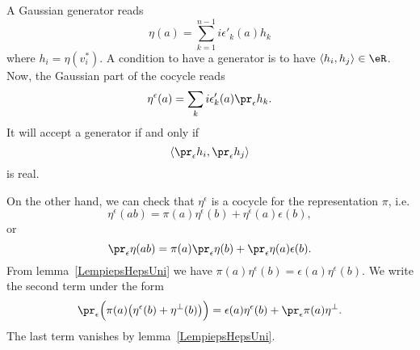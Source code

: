 A Gaussian generator reads
\begin{equation}
	\eta(a)=\sum_{k=1}^{n-1}i\epsilon'_k(a)h_k
\end{equation}
where \(h_i=\eta(v_i^*)\). A condition to have a generator is to have \(\langle h_i, h_j\rangle \in\eR\). Now, the Gaussian part of the cocycle reads
\begin{equation}
	\eta^{\epsilon}(a)=\sum_ki\epsilon'_k(a)\pr_{\epsilon}h_k.
\end{equation}
It will accept a generator if and only if
\begin{equation}
	\langle \pr_{\epsilon}h_i, \pr_{\epsilon}h_j\rangle
\end{equation}
is real.

On the other hand, we can check that \(\eta^{\epsilon}\) is a cocycle for the representation \(\pi\), i.e.
\begin{equation}
	\eta^{\epsilon}(ab)=\pi(a)\eta^{\epsilon}(b)+\eta^{\epsilon}(a)\epsilon(b),
\end{equation}
or
\begin{equation}
	\pr_{\epsilon}\eta(ab)=\pi(a)\pr_{\epsilon}\eta(b)+\pr_{\epsilon}\eta(a)\epsilon(b).
\end{equation}
From lemma~\ref{LempiepsHepsUni} we have \(\pi(a)\eta^{\epsilon}(b)=\epsilon(a)\eta^{\epsilon}(b)\). We write the second term under the form
\begin{equation}
	\pr_{\epsilon}\Big( \pi(a)\big( \eta^{\epsilon}(b)+\eta^{\perp}(b) \big) \Big)=\epsilon(a)\eta^{\epsilon}(b)+\pr_{\epsilon}\pi(a)\eta^{\perp}.
\end{equation}
The last term vanishes by lemma~\ref{LempiepsHepsUni}.
